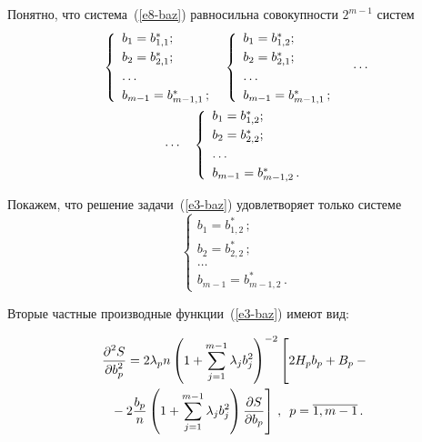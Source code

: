 \begin{multicols}{2}
  Понятно, что система~(\ref{e8-baz}) равносильна совокупности $2^{m-1}$ 
систем
  \begin{multline}
  \left\{
  \begin{array}{l}
  b_1=b^*_{1,1};\\[3pt]
  b_2=b^*_{2,1};\\[3pt]
   \ldots \\[3pt]
  b_{m-1}=b^*_{m-1,1}\,;
  \end{array}\right.
  \enskip 
  \left\{
  \begin{array}{l}
  b_1=b^*_{1,2};\\[3pt]
  b_2=b^*_{2,1};\\[3pt]
   \ldots \\[3pt]
  b_{m-1}=b^*_{m-1,1}\,;
  \end{array}
  \right.\quad \cdots
\\
\cdots \quad \left\{
  \begin{array}{l}
  b_1=b^*_{1,2};\\[3pt]
  b_2=b^*_{2,2};\\[3pt]
   \ldots \\[3pt]
  b_{m-1}=b^*_{m-1,2}\,.
  \end{array}\right.
  \label{e9-baz}
  \end{multline}
  
  Покажем, что решение задачи~(\ref{e3-baz}) удовлетворяет только системе
  \begin{equation}
  \left\{ 
  \begin{array}{l}
  b_1=b^*_{1,2}\,;\\[3pt]
  b_2=b^*_{2,2}\,;\\[3pt]
  \ldots\\[3pt]
  b_{m-1} =b^*_{m-1,2}\,.
  \end{array}
  \right.
  \label{e10-baz}
  \end{equation}
  
  Вторые частные производные функции~(\ref{e3-baz}) имеют вид:
  
  \noindent
  \begin{multline}
  \fr{\partial^2 S}{\partial b_p^2} =2\lambda_p n\left(  1+\sum\limits_{j=1}^{m-1} 
\lambda_j b_j^2\right)^{-2} \left[
\vphantom{\left( 1+\sum\limits_{j=1}^{m-1} \lambda_j b_j^2\right)}
 2H_p b_p +B_p-{}\right.\\
  \left.{}- 2\fr{b_p}{n}\left( 1+\sum\limits_{j=1}^{m-1} \lambda_j b_j^2\right) 
\fr{\partial S}{\partial b_p}\right]\,,\enskip p=\overline{1,m-1}\,.
  \label{e11-baz}
  \end{multline}
  

\end{multicols}
